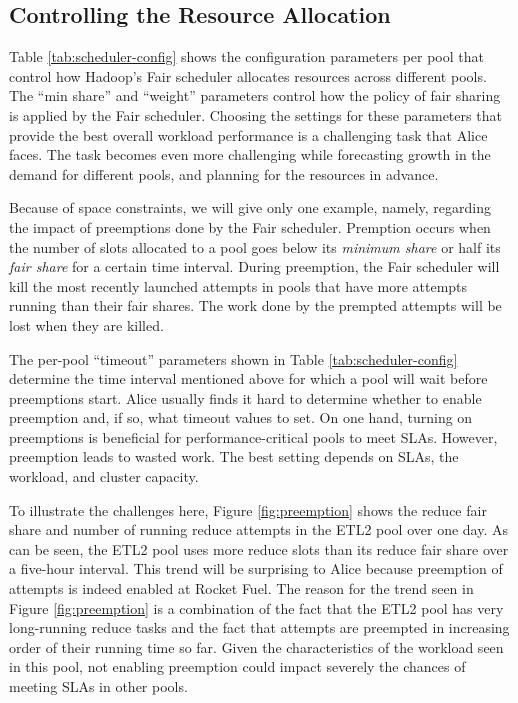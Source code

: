 \subsection{Controlling the Resource Allocation}
\label{sec:preemption}

Table \ref{tab:scheduler-config} shows the configuration 
parameters per pool that control how Hadoop's Fair
scheduler allocates resources across different pools. 
The ``min share'' and ``weight'' parameters control how the
policy of fair sharing is applied by the 
Fair scheduler. Choosing the settings 
for these parameters that provide the best overall 
workload performance is a challenging task that Alice faces. 
The task becomes even more challenging while 
forecasting growth in the demand for different pools, 
and planning for the resources in advance.

Because of space constraints, we will give only one example, namely, 
regarding the impact of preemptions done by the Fair scheduler.
Premption occurs when the number of slots allocated to a pool goes 
below its {\em minimum share} or half its {\em fair share}
for a certain time interval. During preemption, the 
Fair scheduler will kill the most recently launched attempts in pools 
that have more attempts running than their fair shares. The work 
done by the prempted attempts will be lost when they are killed.

The per-pool ``timeout'' parameters shown in Table \ref{tab:scheduler-config}
determine the time interval mentioned above for which a 
pool will wait before preemptions start. 
Alice usually finds it hard to determine whether to enable preemption and, 
if so, what timeout values to set. On one hand, turning on
preemptions is beneficial for performance-critical pools
to meet SLAs. However, preemption leads to wasted work. 
The best setting depends on SLAs, the workload, and cluster capacity. 

To illustrate the challenges here, Figure \ref{fig:preemption} shows the 
reduce fair share and number of 
running reduce attempts in the ETL2 pool over one day. As can be seen,
the ETL2 pool uses more reduce slots than its reduce fair share over
a five-hour interval. This trend will be surprising to Alice
because preemption of attempts is indeed enabled at Rocket Fuel. 
The reason for the trend seen in Figure \ref{fig:preemption} 
is a combination of the fact that the ETL2 pool has very long-running
reduce tasks and the fact that attempts are preempted
in increasing order of their running time so far. Given 
the characteristics of the workload seen in this pool, 
not enabling preemption could impact severely the chances of 
meeting SLAs in other pools. 

